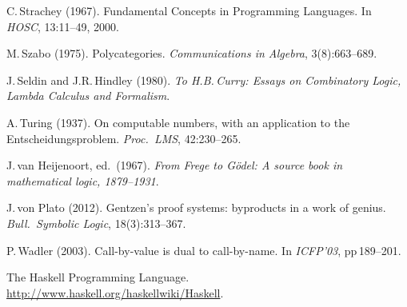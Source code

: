 \documentclass[11pt,twocolumn]{article}
\begin{document}
{\begin{thebibliography}{000}
C.\,Strachey (1967).
\newblock Fundamental Concepts in Programming Languages.  
\newblock In \emph{HOSC}, 13:11--49, 2000.

M.\,Szabo (1975).
\newblock Polycategories.
\newblock \emph{Communications in Algebra}, 3(8):663--689.

J.\,Seldin and J.R.\,Hindley (1980).
\newblock \emph{To H.B.\,Curry: Essays on Combinatory Logic, Lambda
  Calculus and Formalism}.
 
A.\,Turing (1937). 
\newblock On computable numbers, with an application to the
  Entscheidungsproblem. 
\newblock \emph{Proc.\ LMS}, 42:230--265.

J.\,van Heijenoort, ed.\ (1967).
\newblock \emph{From Frege to G\"odel: A source book in mathematical
  logic, 1879--1931}.

J.\,von Plato (2012).
\newblock Gentzen's proof systems: byproducts in a work of genius.
\newblock \emph{Bull.\ Symbolic Logic}, 18(3):313--367.


P.\,Wadler (2003).
\newblock Call-by-value is dual to call-by-name.
\newblock In \emph{ICFP'03}, pp\,189--201.

The Haskell Programming Language.
\newblock \url{http://www.haskell.org/haskellwiki/Haskell}.
\end{thebibliography}
}
\end{document}
